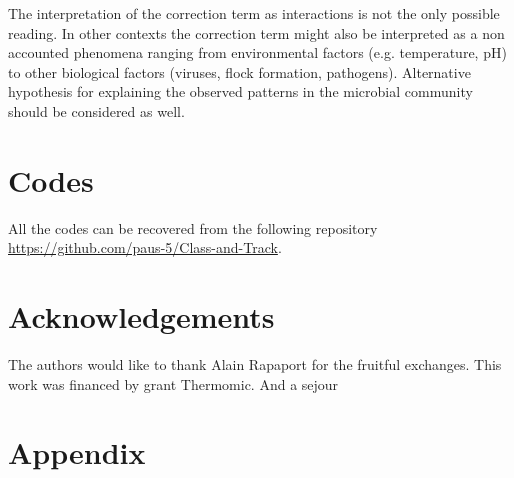 \documentclass[3p,times]{elsarticle}
\begin{document}
The interpretation of the correction term as interactions is not the only possible reading. In other contexts the correction term might also be interpreted as a non accounted phenomena ranging from environmental factors (e.g. temperature, pH) to other biological factors (viruses, flock formation, pathogens). Alternative hypothesis for explaining the observed patterns in the microbial community should be considered as well.  

\section{Codes}

All the codes can be recovered from the following repository \url{https://github.com/paus-5/Class-and-Track}.
\section{Acknowledgements}
 The authors would like to thank Alain Rapaport for the fruitful exchanges. This work was financed by grant Thermomic. And a sejour 

\section{Appendix}
\end{document}
